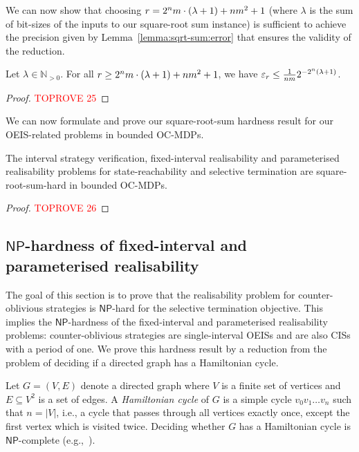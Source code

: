 \documentclass[a4paper,UKenglish,cleveref,autoref,thm-restate,colorlinks]{lipics-v2021}
\newcommand{\np}{\textsf{NP}}
\newcommand{\IN}{\mathbb{N}}
\newcommand{\INpos}{\IN_{>0}}
\newcommand{\graph}{G}
\newcommand{\vertexSet}{V}
\newcommand{\vertex}{v}
\newcommand{\edgeSet}{E}
\newcommand{\indexLast}{n}
\newcommand{\counterUB}{r}
\newcommand{\eleError}[1]{\varepsilon_{#1}}
\begin{document}
We can now show that choosing $\counterUB=2^\sqsn\sqsm\cdot(\lambda+1)+\sqsn\sqsm^2+1$ (where $\lambda$ is the sum of bit-sizes of the inputs to our square-root sum instance) is sufficient to achieve the precision given by Lemma~\ref{lemma:sqrt-sum:error} that ensures the validity of the reduction.

\begin{lemma}\label{lemma:sqrt-sum:bound:ub:error}
  Let $\lambda\in\INpos$.
  For all $\counterUB \geq 2^\sqsn\sqsm\cdot(\lambda+1)+\sqsn\sqsm^2+1$, we have $\eleError{\counterUB}\leq \frac{1}{\sqsn\sqsm}2^{-2^\sqsn(\lambda+1)}$.
\end{lemma}
\begin{proof}\textcolor{red}{TOPROVE 25}\end{proof}

We can now formulate and prove our square-root-sum hardness result for our OEIS-related problems in bounded OC-MDPs.

\begin{theorem}\label{verification:hardness:bounded}
  The interval strategy verification, fixed-interval realisability and parameterised realisability problems for state-reachability and selective termination are square-root-sum-hard in bounded OC-MDPs.
\end{theorem}
\begin{proof}\textcolor{red}{TOPROVE 26}\end{proof}

\subsection{\texorpdfstring{$\np$}{NP}-hardness of fixed-interval and parameterised realisability}\label{section:hardness:np}

The goal of this section is to prove that the realisability problem for counter-oblivious strategies is $\np$-hard for the selective termination objective.
This implies the $\np$-hardness of the fixed-interval and parameterised realisability problems: counter-oblivious strategies are single-interval OEISs and are also CISs with a period of one.
We prove this hardness result by a reduction from the problem of deciding if a directed graph has a Hamiltonian cycle.

Let $\graph = (\vertexSet, \edgeSet)$ denote a directed graph where $\vertexSet$ is a finite set of vertices and $\edgeSet\subseteq\vertexSet^2$ is a set of edges.
A \textit{Hamiltonian cycle} of $\graph$ is a simple cycle $\vertex_0\vertex_1\ldots\vertex_\indexLast$ such that $\indexLast=|\vertexSet|$, i.e., a cycle that passes through all vertices exactly once, except the first vertex which is visited twice.
Deciding whether $\graph$ has a Hamiltonian cycle is $\np{}$-complete (e.g.,~\cite{DBLP:books/fm/GareyJ79}).
\end{document}
